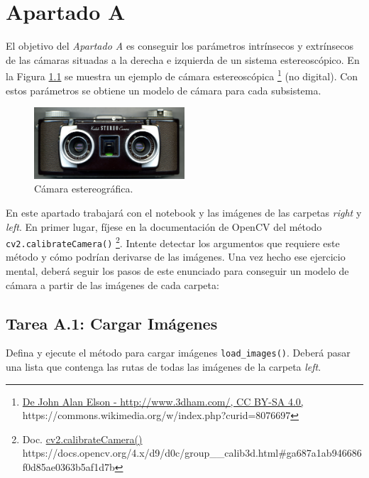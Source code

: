 \chapter{Apartado A}
\label{chapter:tarea_a}

El objetivo del \textit{Apartado A} es conseguir los parámetros intrínsecos y extrínsecos de las cámaras situadas a la derecha e izquierda de un sistema estereoscópico. En la Figura \ref{fig:stereo_camera} se muestra un ejemplo de cámara estereoscópica \footnote{ \href{https://commons.wikimedia.org/w/index.php?curid=8076697}{De John Alan Elson - http://www.3dham.com/, CC BY-SA 4.0, } https://commons.wikimedia.org/w/index.php?curid=8076697} (no digital). Con estos parámetros se obtiene un modelo de cámara para cada subsistema.

\begin{figure}[h]
    \centering
    \includegraphics[width=0.5\textwidth]{Lab 1/template/figures/stereo_camera.jpg}
    \caption{Cámara estereográfica.}
    \label{fig:stereo_camera}
\end{figure}

En este apartado trabajará con el notebook y las imágenes de las carpetas \textit{right} y \textit{left}. En primer lugar, fíjese en la documentación de OpenCV del método \texttt{cv2.calibrateCamera()} \footnote{Doc. \href{https://docs.opencv.org/4.x/d9/d0c/group\_\_calib3d.html\#ga687a1ab946686f0d85ae0363b5af1d7b}{cv2.calibrateCamera()} https://docs.opencv.org/4.x/d9/d0c/group\_\_calib3d.html\#ga687a1ab946686f0d85ae0363b5af1d7b}. Intente detectar los argumentos que requiere este método y cómo podrían derivarse de las imágenes. Una vez hecho ese ejercicio mental, deberá seguir los pasos de este enunciado para conseguir un modelo de cámara a partir de las imágenes de cada carpeta:



\section*{Tarea A.1: Cargar Imágenes}
Defina y ejecute el método para cargar imágenes \texttt{load\_images()}. Deberá pasar una lista que contenga las rutas de todas las imágenes de la carpeta \textit{left}.

